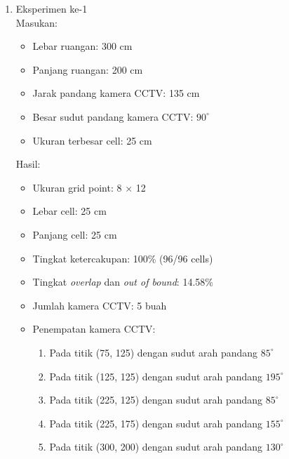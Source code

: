 \begin{enumerate}
	\item Eksperimen ke-1\\
	Masukan:
	\begin{itemize}
		\item Lebar ruangan: 300 cm
		\item Panjang ruangan: 200 cm
		\item Jarak pandang kamera CCTV: 135 cm
		\item Besar sudut pandang kamera CCTV: \(90^\circ\)
		\item Ukuran terbesar cell: 25 cm
	\end{itemize}
	
	Hasil:
	\begin{itemize}
		\item Ukuran grid point: 8 \(\times\) 12
		\item Lebar cell: 25 cm
		\item Panjang cell: 25 cm
		\item Tingkat ketercakupan: 100\% (96/96 cells)
		\item Tingkat \textit{overlap} dan \textit{out of bound}: 14.58\%
		\item Jumlah kamera CCTV: 5 buah
		\item Penempatan kamera CCTV:
		\begin{enumerate}
			\item Pada titik (75, 125) dengan sudut arah pandang \(85^\circ\)
			\item Pada titik (125, 125) dengan sudut arah pandang \(195^\circ\)
			\item Pada titik (225, 125) dengan sudut arah pandang \(85^\circ\)
			\item Pada titik (225, 175) dengan sudut arah pandang \(155^\circ\)
			\item Pada titik (300, 200) dengan sudut arah pandang \(130^\circ\)
		\end{enumerate}
	\end{itemize}
\end{enumerate}























